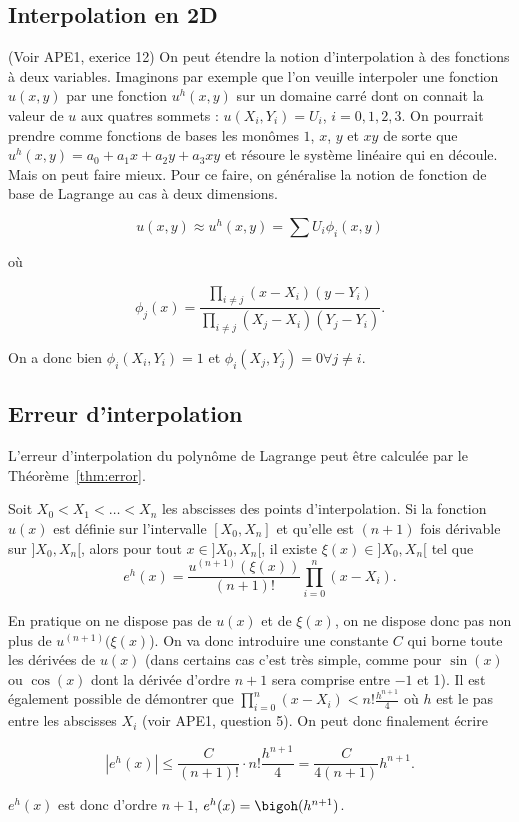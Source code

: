 \subsection{Interpolation en 2D}
(Voir APE1, exerice 12) On peut étendre la notion d'interpolation à des fonctions à deux variables. Imaginons 
par exemple que l'on veuille interpoler une fonction $u(x, y)$ par une fonction $u^h(x, y)$
sur un domaine carré dont on connait la valeur de $u$ aux quatres sommets : $u(X_i, Y_i) = U_i$,
$i = 0, 1, 2, 3.$ On pourrait prendre comme fonctions de bases les monômes $1$, $x$, $y$ et $xy$
de sorte que $u^h(x, y) = a_0 + a_1x + a_2y + a_3xy$ et résoure le système linéaire qui en découle.
Mais on peut faire mieux. Pour ce faire, on généralise la notion de fonction de base de Lagrange au 
cas à deux dimensions.

$$u(x, y) \approx u^h(x, y) = \sum U_i \phi_i(x, y)$$

où

$$\phi_j(x) = \frac{\prod_{i \neq j} (x - X_i)(y - Y_i)}
  {\prod_{i \neq j} (X_j - X_i)(Y_j - Y_i)}.$$
	
On a donc bien $\phi_i(X_i, Y_i) = 1$ et $\phi_i(X_j, Y_j) = 0 \forall j\neq i$.  

\subsection{Erreur d'interpolation}
L'erreur d'interpolation du polynôme de Lagrange peut être calculée
par le Théorème~\ref{thm:error}.
\begin{mytheo}
  \label{thm:error}
  Soit $X_0 < X_1 < \ldots < X_n$ les abscisses des points d'interpolation.
  Si la fonction $u(x)$ est définie sur l'intervalle $[X_0, X_n]$ et qu'elle
  est $(n+1)$ fois dérivable sur $]X_0, X_n[$, alors pour tout
  $x \in ]X_0, X_n[$, il existe $\xi(x) \in ]X_0, X_n[$ tel que
  \[ e^h(x) = \frac{u^{(n+1)}(\xi(x))}{(n+1)!}
  \prod_{i=0}^n (x - X_i). \]
\end{mytheo}

\begin{myrem}\label{rem:borne}
	En pratique on ne dispose pas de $u(x)$ et de $\xi(x)$, on ne dispose donc 
	pas non plus de	$u^{(n+1)}(\xi(x)$). On va donc introduire une constante
	$C$ qui borne toute les dérivées de $u(x)$ (dans certains cas c'est très simple, comme
	pour $\sin(x)$ ou $\cos(x)$ dont la dérivée d'ordre $n+1$ sera comprise
	entre $-1$ et 1). Il est également possible de démontrer que $\prod_{i=0}^n (x - X_i)
	< n! \frac{h^{n+1}}{4}$ où $h$ est le pas entre les abscisses $X_i$ (voir APE1, question 5).
	On peut donc finalement écrire 
	
	$$|e^h(x)| \leq \frac{C}{(n+1)!} \cdot n! \frac{h^{n+1}}{4} = \frac{C}{4(n+1)}h^{n+1}.$$
	
  $e^h(x)$ est donc d'ordre $n+1$, $e^h(x) = \bigoh(h^{n+1})$.
\end{myrem}

